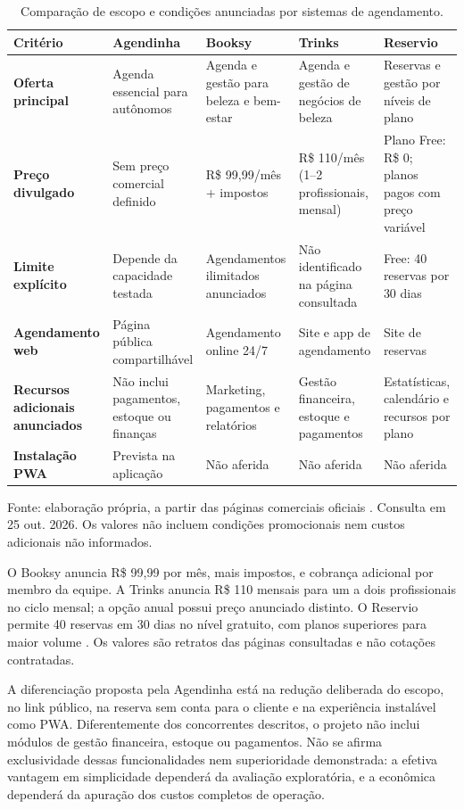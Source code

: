 \begin{table}[htbp]
\centering
\caption{Comparação de escopo e condições anunciadas por sistemas de agendamento.}
\label{tab:comparacao}
\footnotesize
\setlength{\tabcolsep}{4pt}
\begin{tabularx}{\textwidth}{YYYYY}
\toprule
\textbf{Critério} & \textbf{Agendinha} & \textbf{Booksy} & \textbf{Trinks} & \textbf{Reservio} \\
\midrule
\textbf{Oferta principal} & Agenda essencial para autônomos & Agenda e gestão para beleza e bem-estar & Agenda e gestão de negócios de beleza & Reservas e gestão por níveis de plano \\
\textbf{Preço divulgado} & Sem preço comercial definido & R\$ 99,99/mês + impostos & R\$ 110/mês (1--2 profissionais, mensal) & Plano Free: R\$ 0; planos pagos com preço variável \\
\textbf{Limite explícito} & Depende da capacidade testada & Agendamentos ilimitados anunciados & Não identificado na página consultada & Free: 40 reservas por 30 dias \\
\textbf{Agendamento web} & Página pública compartilhável & Agendamento online 24/7 & Site e app de agendamento & Site de reservas \\
\textbf{Recursos adicionais anunciados} & Não inclui pagamentos, estoque ou finanças & Marketing, pagamentos e relatórios & Gestão financeira, estoque e pagamentos & Estatísticas, calendário e recursos por plano \\
\textbf{Instalação PWA} & Prevista na aplicação & Não aferida & Não aferida & Não aferida \\
\bottomrule
\end{tabularx}
\vspace{2mm}

{\footnotesize\raggedright Fonte: elaboração própria, a partir das páginas comerciais oficiais \cite{booksypricing,trinkspricing,reserviopricing}. Consulta em 25 out. 2026. Os valores não incluem condições promocionais nem custos adicionais não informados.\par}
\end{table}

O Booksy anuncia R\$ 99,99 por mês, mais impostos, e cobrança adicional por membro da equipe. A Trinks anuncia R\$ 110 mensais para um a dois profissionais no ciclo mensal; a opção anual possui preço anunciado distinto. O Reservio permite 40 reservas em 30 dias no nível gratuito, com planos superiores para maior volume \cite{booksypricing,trinkspricing,reserviopricing}. Os valores são retratos das páginas consultadas e não cotações contratadas.

A diferenciação proposta pela Agendinha está na redução deliberada do escopo, no link público, na reserva sem conta para o cliente e na experiência instalável como PWA. Diferentemente dos concorrentes descritos, o projeto não inclui módulos de gestão financeira, estoque ou pagamentos. Não se afirma exclusividade dessas funcionalidades nem superioridade demonstrada: a efetiva vantagem em simplicidade dependerá da avaliação exploratória, e a econômica dependerá da apuração dos custos completos de operação.

\FloatBarrier
